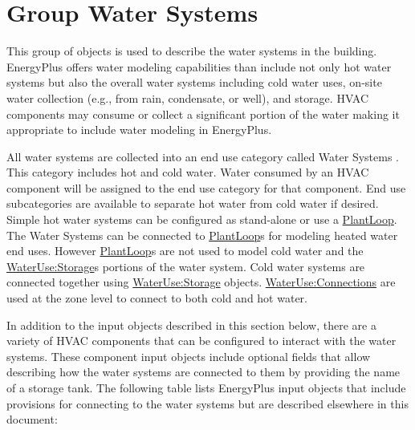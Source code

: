 \section{Group Water Systems}\label{group-water-systems}

This group of objects is used to describe the water systems in the building. EnergyPlus offers water modeling capabilities than include not only hot water systems but also the overall water systems including cold water uses, on-site water collection (e.g., from rain, condensate, or well), and storage. HVAC components may consume or collect a significant portion of the water making it appropriate to include water modeling in EnergyPlus.

All water systems are collected into an end use category called Water Systems . This category includes hot and cold water. Water consumed by an HVAC component will be assigned to the end use category for that component. End use subcategories are available to separate hot water from cold water if desired. Simple hot water systems can be configured as stand-alone or use a \hyperref[plantloop]{PlantLoop}. The Water Systems can be connected to \hyperref[plantloop]{PlantLoop}s for modeling heated water end uses. However \hyperref[plantloop]{PlantLoop}s are not used to model cold water and the \hyperref[waterusestorage]{WaterUse:Storage}s portions of the water system. Cold water systems are connected together using \hyperref[waterusestorage]{WaterUse:Storage} objects. \hyperref[wateruseconnections]{WaterUse:Connections} are used at the zone level to connect to both cold and hot water.

In addition to the input objects described in this section below, there are a variety of HVAC components that can be configured to interact with the water systems. These component input objects include optional fields that allow describing how the water systems are connected to them by providing the name of a storage tank. The following table lists EnergyPlus input objects that include provisions for connecting to the water systems but are described elsewhere in this document:


